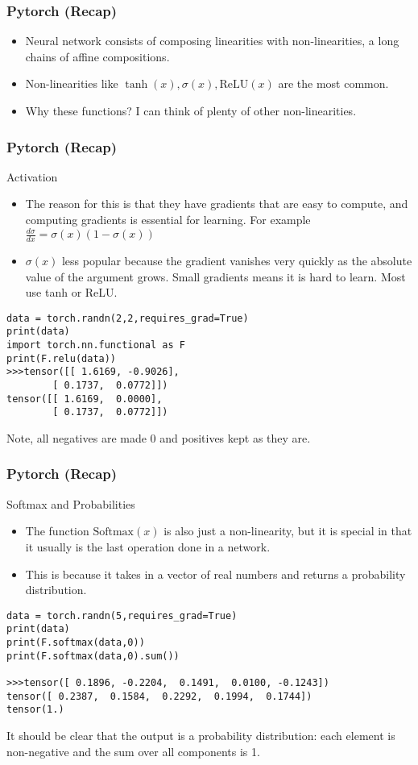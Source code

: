  
\begin{frame}[fragile]
\frametitle{Pytorch (Recap)}

\begin{itemize}
\item Neural network consists of composing linearities with non-linearities, a long chains of affine compositions.
\item Non-linearities like $\tanh(x), \sigma(x), \text{ReLU}(x)$ are the most common.
\item Why these functions? I can think of plenty of other non-linearities.
\end{itemize}
\end{frame} 

\begin{frame}[fragile]
\frametitle{Pytorch (Recap)}
Activation
\begin{itemize}
\item The reason for this is that they have gradients that are easy to compute, and computing gradients is essential for learning. For example $ \frac{d\sigma}{dx} = \sigma(x)(1 - \sigma(x)) $
\item $ \sigma(x)$ less popular because the gradient vanishes very quickly as the absolute value of the argument grows. Small gradients means it is hard to learn. Most use tanh or ReLU.
\end{itemize}
 \begin{lstlisting}
data = torch.randn(2,2,requires_grad=True)
print(data)
import torch.nn.functional as F
print(F.relu(data))
>>>tensor([[ 1.6169, -0.9026],
        [ 0.1737,  0.0772]])
tensor([[ 1.6169,  0.0000],
        [ 0.1737,  0.0772]])
 \end{lstlisting}
 Note, all negatives are made 0 and positives kept as they are.
\end{frame} 

\begin{frame}[fragile]
\frametitle{Pytorch (Recap)}
Softmax and Probabilities
\begin{itemize}
\item The function $\text{Softmax}(x)$ is also just a non-linearity, but it is special in that it usually is the last operation done in a network. 
\item This is because it takes in a vector of real numbers and returns a probability distribution.
\end{itemize}
 \begin{lstlisting}
data = torch.randn(5,requires_grad=True)
print(data)
print(F.softmax(data,0))
print(F.softmax(data,0).sum())

>>>tensor([ 0.1896, -0.2204,  0.1491,  0.0100, -0.1243])
tensor([ 0.2387,  0.1584,  0.2292,  0.1994,  0.1744])
tensor(1.)
 \end{lstlisting}
It should be clear that the output is a probability distribution: each element is non-negative and the sum over all components is 1.
\end{frame} 

